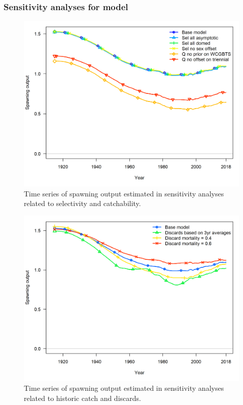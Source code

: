 \documentclass[12pt,]{article}
\begin{document}
\hypertarget{sensitivity-analyses-for-model}{%
\subsubsection{Sensitivity analyses for
model}\label{sensitivity-analyses-for-model}}

\begin{figure}
\centering
\includegraphics{Figures/sens.sel_and_Q_compare1_spawnbio.png}
\caption{Time series of spawning output estimated in sensitivity
analyses related to selectivity and catchability.
\label{fig:Sensitivity_sel_and_Q}}
\end{figure}

\begin{figure}
\centering
\includegraphics{Figures/sens.catch_compare1_spawnbio.png}
\caption{Time series of spawning output estimated in sensitivity
analyses related to historic catch and discards.
\label{fig:Sensitivity_catch}}
\end{figure}
\end{document}

